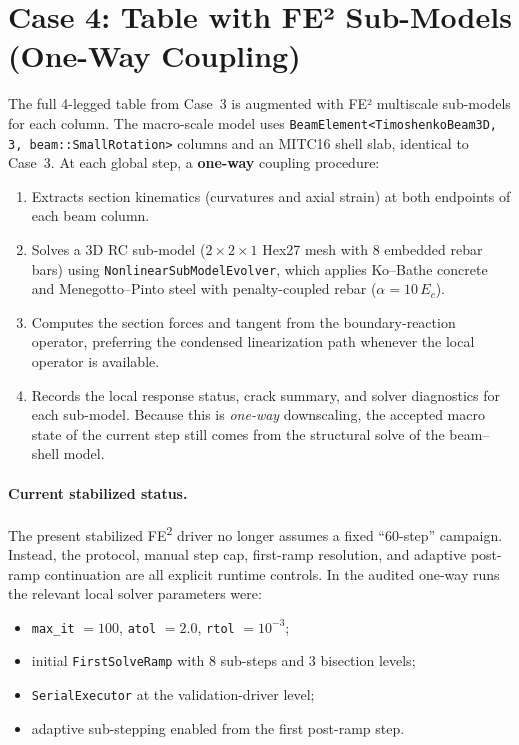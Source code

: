 \section{Case 4: Table with FE² Sub-Models (One-Way Coupling)}
\label{sec:cyclic-case4}

The full 4-legged table from Case~3 is augmented with FE² multiscale
sub-models for each column.  The macro-scale model uses
\texttt{BeamElement<TimoshenkoBeam3D, 3, beam::SmallRotation>}
columns and an MITC16 shell slab, identical to Case~3.  At each
global step, a \textbf{one-way} coupling procedure:

\begin{enumerate}
  \item Extracts section kinematics (curvatures and axial strain)
    at both endpoints of each beam column.
  \item Solves a 3D RC sub-model ($2 \times 2 \times 1$ Hex27 mesh
    with 8 embedded rebar bars) using
    \texttt{NonlinearSubModelEvolver}, which applies Ko--Bathe
    concrete and Menegotto--Pinto steel with penalty-coupled rebar
    ($\alpha = 10\,E_c$).
  \item Computes the section forces and tangent from the
    boundary-reaction operator, preferring the condensed linearization path
    whenever the local operator is available.
  \item Records the local response status, crack summary, and solver
    diagnostics for each sub-model.  Because this is \emph{one-way}
    downscaling, the accepted macro state of the current step still comes from
    the structural solve of the beam--shell model.
\end{enumerate}

\paragraph{Current stabilized status.}
The present stabilized FE\textsuperscript{2} driver no longer assumes a fixed
``60-step'' campaign.  Instead, the protocol, manual step cap, first-ramp
resolution, and adaptive post-ramp continuation are all explicit runtime
controls.  In the audited one-way runs the relevant local solver parameters
were:
\begin{itemize}
  \item \texttt{max\_it} $= 100$, \texttt{atol} $= 2.0$,
    \texttt{rtol} $= 10^{-3}$;
  \item initial \texttt{FirstSolveRamp} with 8 sub-steps and 3 bisection
    levels;
  \item \texttt{SerialExecutor} at the validation-driver level;
  \item adaptive sub-stepping enabled from the first post-ramp step.
\end{itemize}

